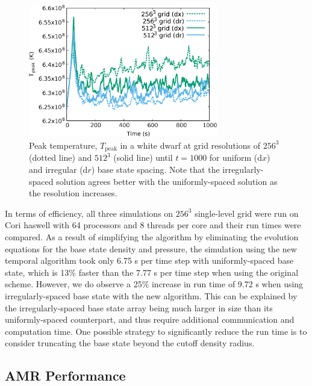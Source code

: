\begin{figure}[hbt]
\begin{center}
\includegraphics[width=3.25in]{./figs/wdconvect_compare_Tmax}
\caption{\label{fig:wdconvect_Tmax} Peak temperature, $T_{\text{peak}}$  in a white dwarf at grid resolutions of
         $256^3$ (dotted line) and $512^3$ (solid line) until $t=1000$ for uniform (d$x$) and irregular (d$r$) base state spacing.
         Note that the irregularly-spaced solution agrees better
         with the uniformly-spaced solution as the resolution increases.}
\end{center}
\end{figure}

In terms of efficiency, all three simulations on $256^3$ single-level grid were run on Cori haswell with 64 processors and 8 threads per core and their run times were compared. As a result of simplifying the algorithm by eliminating the evolution equations for the base state density and pressure, the simulation using the new temporal algorithm took only 6.75 s per time step with uniformly-spaced base state, which is 13\% faster than the 7.77 s per time step when using the original scheme. However, we do observe a 25\% increase in run time of 9.72 s when using irregularly-spaced base state with the new algorithm. This can be explained by the irregularly-spaced base state array being much larger in size than its uniformly-spaced counterpart, and thus require additional communication and computation time. One possible strategy to significantly reduce the run time is to consider truncating the base state beyond the cutoff density radius.


\subsection{AMR Performance}

